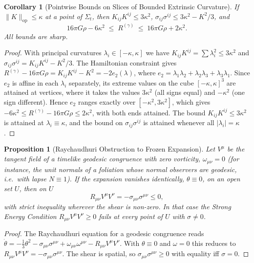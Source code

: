 \documentclass[11pt,reqno]{amsart}
\newtheorem{proposition}[theorem]{Proposition}
\newtheorem{corollary}[theorem]{Corollary}
\theoremstyle{definition}
\newcommand{\op}{\mathrm{op}}
\numberwithin{equation}{section}
\begin{document}
\begin{corollary}[Pointwise Bounds on Slices of Bounded Extrinsic Curvature]
\label{cor:adm_bounds}
If $\|K\|_{\op} \le \kappa$ at a point of $\Sigma_t$, then $K_{ij}K^{ij} \le 3\kappa^2$, $\sigma_{ij}\sigma^{ij} \le 3\kappa^2 - K^2/3$, and
\[
16\pi G\rho - 6\kappa^2 \;\le\; R^{(\gamma)} \;\le\; 16\pi G \rho + 2\kappa^2 .
\]
All bounds are sharp.
\end{corollary}
\begin{proof}
With principal curvatures $\lambda_i \in [-\kappa,\kappa]$ we have $K_{ij}K^{ij} = \sum\lambda_i^2 \le 3\kappa^2$ and $\sigma_{ij}\sigma^{ij} = K_{ij}K^{ij} - K^2/3$. The Hamiltonian constraint gives $R^{(\gamma)} - 16\pi G\rho = K_{ij}K^{ij} - K^2 = -2e_2(\lambda)$, where $e_2 = \lambda_1\lambda_2 + \lambda_2\lambda_3 + \lambda_3\lambda_1$. Since $e_2$ is affine in each $\lambda_i$ separately, its extreme values on the cube $[-\kappa,\kappa]^3$ are attained at vertices, where it takes the values $3\kappa^2$ (all signs equal) and $-\kappa^2$ (one sign different). Hence $e_2$ ranges exactly over $[-\kappa^2, 3\kappa^2]$, which gives $-6\kappa^2 \le R^{(\gamma)} - 16\pi G\rho \le 2\kappa^2$, with both ends attained. The bound $K_{ij}K^{ij} \le 3\kappa^2$ is attained at $\lambda_i \equiv \kappa$, and the bound on $\sigma_{ij}\sigma^{ij}$ is attained whenever all $|\lambda_i| = \kappa$.
\end{proof}

\begin{proposition}[Raychaudhuri Obstruction to Frozen Expansion]
\label{prop:raychaudhuri}
Let $V^\mu$ be the tangent field of a timelike geodesic congruence with zero vorticity, $\omega_{\mu\nu} = 0$ (for instance, the unit normals of a foliation whose normal observers are geodesic, i.e.\ with lapse $N \equiv 1$). If the expansion vanishes identically, $\theta \equiv 0$, on an open set $U$, then on $U$
\[
R_{\mu\nu}V^\mu V^\nu = -\sigma_{\mu\nu}\sigma^{\mu\nu} \le 0,
\]
with strict inequality wherever the shear is non-zero. In that case the Strong Energy Condition $R_{\mu\nu}V^\mu V^\nu \ge 0$ fails at every point of $U$ with $\sigma \ne 0$.
\end{proposition}
\begin{proof}
The Raychaudhuri equation \cite{raychaudhuri1955} for a geodesic congruence reads
$\dot\theta = -\tfrac{1}{3}\theta^2 - \sigma_{\mu\nu}\sigma^{\mu\nu} + \omega_{\mu\nu}\omega^{\mu\nu} - R_{\mu\nu}V^\mu V^\nu$.
With $\theta \equiv 0$ and $\omega = 0$ this reduces to $R_{\mu\nu}V^\mu V^\nu = -\sigma_{\mu\nu}\sigma^{\mu\nu}$. The shear is spatial, so $\sigma_{\mu\nu}\sigma^{\mu\nu} \ge 0$ with equality iff $\sigma = 0$.
\end{proof}
\end{document}
